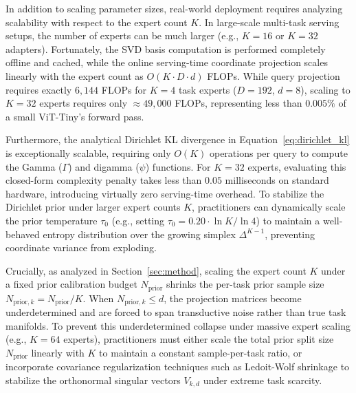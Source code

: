In addition to scaling parameter sizes, real-world deployment requires analyzing scalability with respect to the expert count $K$. In large-scale multi-task serving setups, the number of experts can be much larger (e.g., $K=16$ or $K=32$ adapters). Fortunately, the SVD basis computation is performed completely offline and cached, while the online serving-time coordinate projection scales linearly with the expert count as $O(K \cdot D \cdot d)$ FLOPs. While query projection requires exactly $6,144$ FLOPs for $K=4$ task experts ($D=192$, $d=8$), scaling to $K=32$ experts requires only $\approx 49,000$ FLOPs, representing less than $0.005\%$ of a small ViT-Tiny's forward pass. 

Furthermore, the analytical Dirichlet KL divergence in Equation~\eqref{eq:dirichlet_kl} is exceptionally scalable, requiring only $O(K)$ operations per query to compute the Gamma ($\Gamma$) and digamma ($\psi$) functions. For $K=32$ experts, evaluating this closed-form complexity penalty takes less than $0.05$ milliseconds on standard hardware, introducing virtually zero serving-time overhead. To stabilize the Dirichlet prior under larger expert counts $K$, practitioners can dynamically scale the prior temperature $\tau_0$ (e.g., setting $\tau_0 = 0.20 \cdot \ln K / \ln 4$) to maintain a well-behaved entropy distribution over the growing simplex $\Delta^{K-1}$, preventing coordinate variance from exploding.

Crucially, as analyzed in Section~\ref{sec:method}, scaling the expert count $K$ under a fixed prior calibration budget $N_{\text{prior}}$ shrinks the per-task prior sample size $N_{\text{prior}, k} = N_{\text{prior}}/K$. When $N_{\text{prior}, k} \le d$, the projection matrices become underdetermined and are forced to span transductive noise rather than true task manifolds. To prevent this underdetermined collapse under massive expert scaling (e.g., $K = 64$ experts), practitioners must either scale the total prior split size $N_{\text{prior}}$ linearly with $K$ to maintain a constant sample-per-task ratio, or incorporate covariance regularization techniques such as Ledoit-Wolf shrinkage to stabilize the orthonormal singular vectors $V_{k, d}$ under extreme task scarcity.

